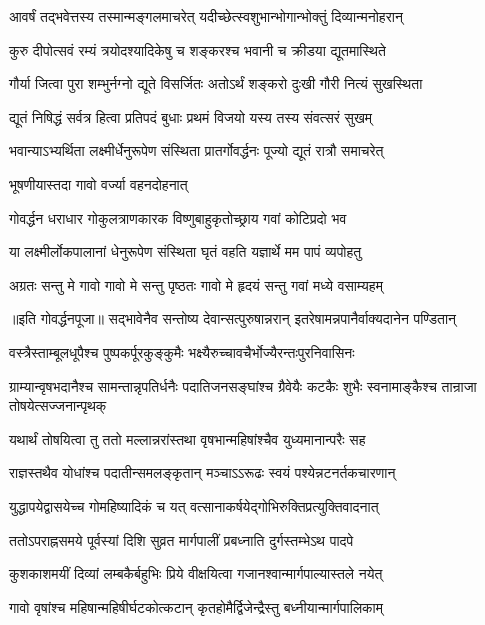 \twolineshloka
{आवर्षं तद्भवेत्तस्य तस्मान्मङ्गलमाचरेत्}
{यदीच्छेत्स्वशुभान्भोगान्भोक्तुं दिव्यान्मनोहरान्} %

\twolineshloka
{कुरु दीपोत्सवं रम्यं त्रयोदश्यादिकेषु च}
{शङ्करश्च भवानी च क्रीडया द्यूतमास्थिते} %

\twolineshloka
{गौर्या जित्वा पुरा शम्भुर्नग्नो द्यूते विसर्जितः}
{अतोऽर्थं शङ्करो दुःखी गौरी नित्यं सुखस्थिता} %

\twolineshloka
{द्यूतं निषिद्धं सर्वत्र हित्वा प्रतिपदं बुधाः}
{प्रथमं विजयो यस्य तस्य संवत्सरं सुखम्} %

\twolineshloka
{भवान्याऽभ्यर्थिता लक्ष्मीर्धेनुरूपेण संस्थिता}
{प्रातर्गोवर्द्धनः पूज्यो द्यूतं रात्रौ समाचरेत्} %


\onelineshloka
{भूषणीयास्तदा गावो वर्ज्या वहनदोहनात्} %

\twolineshloka
{गोवर्द्धन धराधार गोकुलत्राणकारक}
{विष्णुबाहुकृतोच्छ्राय गवां कोटिप्रदो भव} %

\twolineshloka
{या लक्ष्मीर्लोकपालानां धेनुरूपेण संस्थिता}
{घृतं वहति यज्ञार्थे मम पापं व्यपोहतु} %

\twolineshloka
{अग्रतः सन्तु मे गावो गावो मे सन्तु पृष्ठतः}
{गावो मे हृदयं सन्तु गवां मध्ये वसाम्यहम्} %


॥इति गोवर्द्धनपूजा॥
\twolineshloka
{सद्भावेनैव सन्तोष्य देवान्सत्पुरुषान्नरान्}
{इतरेषामन्नपानैर्वाक्यदानेन पण्डितान्} %

\twolineshloka
{वस्त्रैस्ताम्बूलधूपैश्च पुष्पकर्पूरकुङ्कुमैः}
{भक्ष्यैरुच्चावचैर्भोज्यैरन्तःपुरनिवासिनः} %

\threelineshloka
{ग्राम्यान्वृषभदानैश्च सामन्तान्नृपतिर्धनैः}
{पदातिजनसङ्घांश्च ग्रैवेयैः कटकैः शुभैः}
{स्वनामाङ्कैश्च तान्राजा तोषयेत्सज्जनान्पृथक्} %

\twolineshloka
{यथार्थं तोषयित्वा तु ततो मल्लान्नरांस्तथा}
{वृषभान्महिषांश्चैव युध्यमानान्परैः सह} %

\twolineshloka
{राज्ञस्तथैव योधांश्च पदातीन्समलङ्कृतान्}
{मञ्चाऽऽरूढः स्वयं पश्येन्नटनर्तकचारणान्} %

\twolineshloka
{युद्धापयेद्वासयेच्च गोमहिष्यादिकं च यत्}
{वत्सानाकर्षयेद्गोभिरुक्तिप्रत्युक्तिवादनात्} %

\twolineshloka
{ततोऽपराह्नसमये पूर्वस्यां दिशि सुव्रत}
{मार्गपालीं प्रबध्नाति दुर्गस्तम्भेऽथ पादपे} %

\twolineshloka
{कुशकाशमयीं दिव्यां लम्बकैर्बहुभिः प्रिये}
{वीक्षयित्वा गजानश्वान्मार्गपाल्यास्तले नयेत्} %

\twolineshloka
{गावो वृषांश्च महिषान्महिषीर्घटकोत्कटान्}
{कृतहोमैर्द्विजेन्द्रैस्तु बध्नीयान्मार्गपालिकाम्} %

